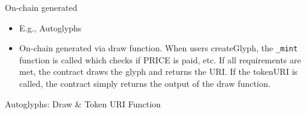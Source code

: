 \documentclass[handout]{beamer}
\begin{document}
\begin{frame}{On-chain generated}
	\begin{itemize}
		\item E.g., Autoglyphs
		\item On-chain generated via draw function. When users createGlyph, the \texttt{\_mint} function is called which checks if PRICE is paid, etc. If all requirements are met, the contract draws the glyph and returns the URI. If the tokenURI is called, the contract simply returns the output of the draw function.
	\end{itemize}
	\begin{samplecode}{Autoglyphs: Draw \& Token URI Function}
		
	\end{samplecode}
\end{frame}
\end{document}
